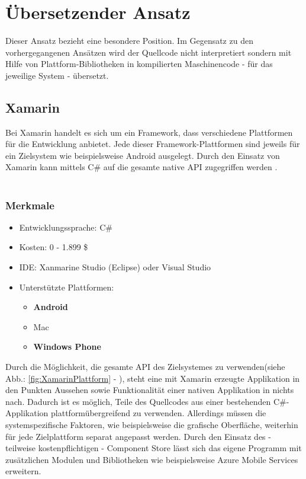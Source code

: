 \documentclass[../Bachelorarbeit.tex]{subfiles}
\begin{document}
\newpage
\section{Übersetzender Ansatz}
Dieser Ansatz bezieht eine besondere Position. 
Im Gegensatz zu den vorhergegangenen Ansätzen wird der Quellcode nicht interpretiert sondern mit Hilfe von Plattform-Bibliotheken in kompilierten Maschinencode - für das jeweilige System - übersetzt.


\subsection*{Xamarin}
\label{subsec:xamarin}

Bei Xamarin handelt es sich um ein Framework, dass verschiedene Plattformen für die Entwicklung anbietet. 
Jede dieser Framework-Plattformen sind jeweils für ein Zielsystem wie beispielsweise Android ausgelegt. 
Durch den Einsatz von Xamarin kann mittels C\# auf die gesamte native \ac{API} zugegriffen werden \parencite[vgl. ][S. 10]{xamarin_whitepaper}.\\
\\
\subsubsection*{Merkmale}
\begin{itemize}
\item Entwicklungssprache: C\#
\item Kosten:  0 - 1.899 \$ 
\item \ac{IDE}: Xanmarine Studio (Eclipse) oder Visual Studio
\item Unterstützte Plattformen: 
\begin{itemize}
\item \textbf{Android}

\item Mac
\item \textbf{Windows Phone}
\end{itemize}
\end{itemize}

 
Durch die Möglichkeit, die gesamte \ac{API} des Zielsystemes zu verwenden(siehe Abb.: \ref{fig:XamarinPlattform} - ), steht eine mit Xamarin erzeugte Applikation in den Punkten Aussehen sowie Funktionalität einer nativen Applikation in nichts nach. 
Dadurch ist es möglich, Teile des Quellcodes aus einer bestehenden C\#-Applikation plattformübergreifend zu verwenden. 
Allerdings müssen die systemspezifische Faktoren, wie beispielsweise die grafische Oberfläche, weiterhin für jede Zielplattform separat angepasst werden. 
Durch den Einsatz des - teilweise kostenpflichtigen - Component Store lässt sich das eigene Programm mit zusätzlichen Modulen und Bibliotheken wie beispielsweise Azure Mobile Services erweitern.\\
\\
\end{document}
